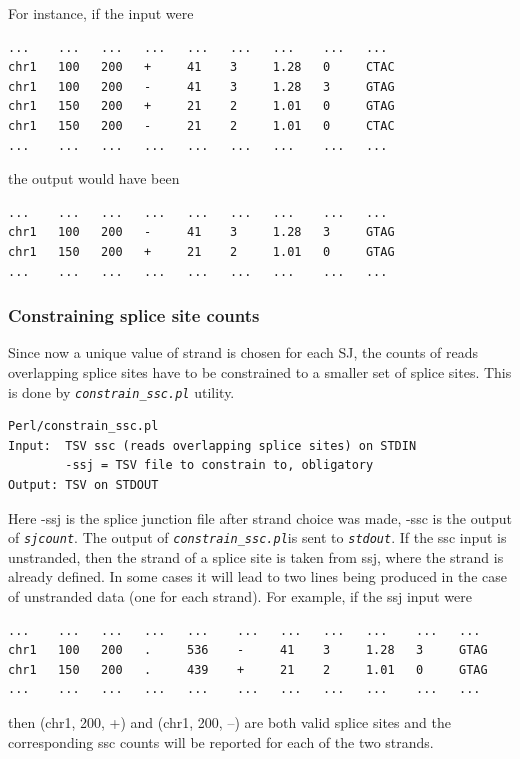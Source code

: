 \documentclass{article}
\newcommand{\prog}[1]{{\tt\em #1}}
\begin{document}
For instance, if the input were
\begin{verbatim}
...    ...   ...   ...   ...   ...   ...    ...   ...
chr1   100   200   +     41    3     1.28   0     CTAC
chr1   100   200   -     41    3     1.28   3     GTAG
chr1   150   200   +     21    2     1.01   0     GTAG
chr1   150   200   -     21    2     1.01   0     CTAC
...    ...   ...   ...   ...   ...   ...    ...   ...
\end{verbatim}
the output would have been 
\begin{verbatim}
...    ...   ...   ...   ...   ...   ...    ...   ...
chr1   100   200   -     41    3     1.28   3     GTAG
chr1   150   200   +     21    2     1.01   0     GTAG
...    ...   ...   ...   ...   ...   ...    ...   ...
\end{verbatim}


\subsubsection{Constraining splice site counts}
Since now a unique value of strand is chosen for each SJ, the counts of reads overlapping splice sites have to be constrained to a smaller set of splice sites.
This is done by \prog{constrain\_ssc.pl} utility.
\begin{verbatim}
Perl/constrain_ssc.pl
Input:  TSV ssc (reads overlapping splice sites) on STDIN
        -ssj = TSV file to constrain to, obligatory
Output: TSV on STDOUT
\end{verbatim}
Here -ssj is the splice junction file after strand choice was made, -ssc is the output of \prog{sjcount}. The output of \prog{constrain\_ssc.pl}is sent to \prog{stdout}. 
If the ssc input is unstranded, then the strand of a splice site is taken from ssj, where the strand is already defined. In some cases it will lead to two 
lines being produced in the case of unstranded data (one for each strand). For example, if the ssj input were
\begin{verbatim}
...    ...   ...   ...   ...    ...   ...   ...   ...    ...   ...
chr1   100   200   .     536    -     41    3     1.28   3     GTAG
chr1   150   200   .     439    +     21    2     1.01   0     GTAG
...    ...   ...   ...   ...    ...   ...   ...   ...    ...   ...
\end{verbatim}
then (chr1, 200, +) and (chr1, 200, --) are both valid splice sites and the corresponding ssc counts will be reported for each of the two strands.
\end{document}

